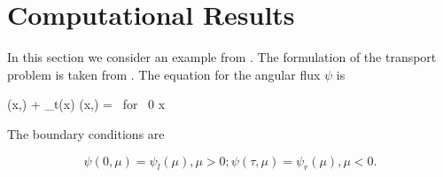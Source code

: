 \section{Computational Results}
\label{sec:results}
In this section we consider an example from
\cite{cesinh}. The formulation of the transport
problem is taken from \cite{ctk:jeff1}. The equation for the angular
flux \(\psi\) is

\begeq
\label{eq:transportgs}
\mu {} (x,\mu) + \Sigma_t(x) \psi(x,\mu) =
 
 \mbox{ for } 0 \le x \le \tau
\endeq

The boundary conditions are

\[
\psi(0, \mu) = \psi_l(\mu), \mu > 0; \psi(\tau, \mu) = \psi_r(\mu),
\mu < 0.
\]

